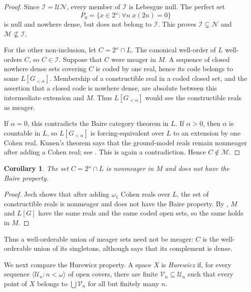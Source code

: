 \documentclass[11pt,reqno]{amsart}
\newcommand{\UN}{\mathcal{UN}}
\newcommand{\cM}{\mathcal M}
\newcommand{\cN}{\mathcal N}
\theoremstyle{plain}
\newtheorem{corollary}[corollary]{Corollary}
\theoremstyle{definition}
\theoremstyle{remark}
\begin{document}
\begin{proof}
Since $\mathcal I=\UN$, every member of $\mathcal I$ is Lebesgue null.  The
perfect set
\[
 P_0=\{x\in2^\omega:\forall n\;x(2n)=0\}
\]
is null and nowhere dense, but does not belong to $\mathcal I$.  This proves
$\mathcal I\subsetneq\cN$ and $\cM\nsubseteq\mathcal I$.

For the other non-inclusion, let $C=2^\omega\cap L$.  The canonical well-order
of $L$ well-orders $C$, so $C\in\mathcal I$.  Suppose that $C$ were meager in
$M$.  A sequence of closed nowhere dense sets covering $C$ is coded by one
real, hence its code belongs to some $L[G_{<\alpha}]$.  Membership of a
constructible real in a coded closed set, and the assertion that a closed code
is nowhere dense, are absolute between this intermediate extension and $M$.
Thus $L[G_{<\alpha}]$ would see the constructible reals as meager.

If $\alpha=0$, this contradicts the Baire category theorem in $L$.  If
$\alpha>0$, then $\alpha$ is countable in $L$, so
$L[G_{<\alpha}]$ is forcing-equivalent over $L$ to an extension by one Cohen
real.  Kunen's theorem says that the ground-model reals remain nonmeager after
adding a Cohen real; see \cite[Theorem 1.4]{Cardona2020}.  This is again a
contradiction.  Hence $C\notin\cM$.
\end{proof}
\begin{corollary}\label{cor:constructible-nonbp}
The set $C=2^\omega\cap L$ is nonmeager in $M$ and does not have the Baire property.
\end{corollary}

\begin{proof}
Jech \cite[Lemma 26.50 and Example 26.52]{Jech2003} shows that after adding $\omega_1$ Cohen reals over $L$, the set of constructible reals is nonmeager and does not have the Baire property.
By , $M$ and $L[G]$ have the same reals and the same coded open sets, so the same holds in $M$.
\end{proof}

Thus a well-orderable union of meager sets need not be meager: $C$ is the
well-orderable union of its singletons, although
 says that its complement is dense.

We next compare the Hurewicz property.  A space $X$ is \emph{Hurewicz} if,
for every sequence $\langle\mathcal U_n:n<\omega\rangle$ of open covers,
there are finite $\mathcal V_n\subseteq\mathcal U_n$ such that every point of
$X$ belongs to $\bigcup\mathcal V_n$ for all but finitely many $n$.
\end{document}
